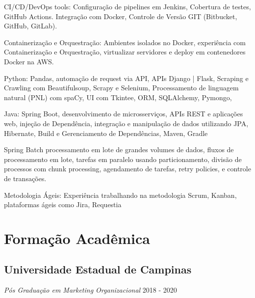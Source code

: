 \documentclass[a4paper,10pt]{article}
\begin{document}
\vspace{1.5mm}\textcolor{corSubSection}{CI/CD/DevOps tools:}
Configuração de pipelines em Jenkins,
Cobertura de testes,
GitHub Actions.
Integração com Docker,
Controle de Versão GIT (Bitbucket, GitHub, GitLab).

\vspace{1.5mm}\textcolor{corSubSection}{Containerização e Orquestração:}
Ambientes isolados no Docker,
experiência com Containerização e Orquestração,
virtualizar servidores e deploy em
contenedores Docker na AWS.

\vspace{1.5mm}\textcolor{corSubSection}{Python:}
Pandas,
automação de request via API,
APIs Django | Flask,
Scraping e Crawling com Beautifulsoup,
Scrapy e Selenium,
Processamento de linguagem natural (PNL) com spaCy,
UI com Tkintee,
ORM, SQLAlchemy, Pymongo,

\vspace{1.5mm}\textcolor{corSubSection}{Java:}
Spring Boot, desenvolvimento de microsserviços, APIs REST e aplicações web,
injeção de Dependência,
integração e manipulação de dados utilizando
JPA, Hibernate,
Build e Gerenciamento de Dependências, Maven, Gradle

Spring Batch
processamento em lote de grandes volumes de dados,
fluxos de processamento em lote,
tarefas em paralelo usando particionamento,
divisão de processos com chunk processing,
agendamento de tarefas, retry policies,
e controle de transações.

\vspace{1.5mm}\textcolor{corSubSection}{Metodologia Ágeis:}
Experiência trabalhando na metodologia Scrum, Kanban, plataformas ágeis como Jira, Requestia


\clearpage
\section*{Formação Acadêmica}
\noindent\makebox[\linewidth]{\rule{\linewidth}{0.1mm}\textcolor{corLarge}{}}

\subsection*{Universidade Estadual de Campinas}
\textcolor{corSubSection}{\emph{Pós Graduação em Marketing Organizacional}}
\hfill \textcolor{corSubSection}{2018 - 2020}
\end{document}
